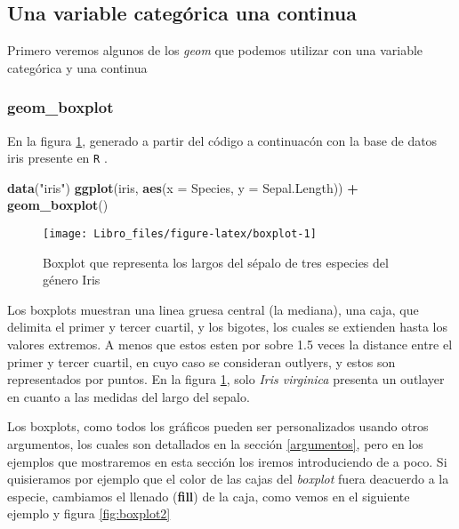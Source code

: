 \documentclass[]{book}
\newenvironment{Shaded}{\begin{snugshade}}{\end{snugshade}}
\newcommand{\DataTypeTok}[1]{\textcolor[rgb]{0.13,0.29,0.53}{#1}}
\newcommand{\KeywordTok}[1]{\textcolor[rgb]{0.13,0.29,0.53}{\textbf{#1}}}
\newcommand{\NormalTok}[1]{#1}
\newcommand{\OperatorTok}[1]{\textcolor[rgb]{0.81,0.36,0.00}{\textbf{#1}}}
\newcommand{\StringTok}[1]{\textcolor[rgb]{0.31,0.60,0.02}{#1}}
\begin{document}
\hypertarget{una-variable-categorica-una-continua}{%
\subsection{Una variable categórica una
continua}\label{una-variable-categorica-una-continua}}

Primero veremos algunos de los \emph{geom} que podemos utilizar con una
variable categórica y una continua

\hypertarget{geom_boxplot}{%
\subsubsection{geom\_boxplot}\label{geom_boxplot}}

En la figura \ref{fig:boxplot}, generado a partir del código a
continuacón con la base de datos iris presente en \texttt{R}
\citep{anderson1935irises}.

\begin{Shaded}
\begin{Highlighting}[]
\KeywordTok{data}\NormalTok{(}\StringTok{"iris"}\NormalTok{)}
\KeywordTok{ggplot}\NormalTok{(iris, }\KeywordTok{aes}\NormalTok{(}\DataTypeTok{x =}\NormalTok{ Species, }\DataTypeTok{y =}\NormalTok{ Sepal.Length)) }\OperatorTok{+}\StringTok{ }\KeywordTok{geom_boxplot}\NormalTok{()}
\end{Highlighting}
\end{Shaded}

\begin{figure}

{\centering \texttt{[image: Libro\_files/figure-latex/boxplot-1]} 

}

\caption{Boxplot que representa los largos del sépalo de tres especies del género Iris}\label{fig:boxplot}
\end{figure}

Los boxplots muestran una linea gruesa central (la mediana), una caja,
que delimita el primer y tercer cuartil, y los bigotes, los cuales se
extienden hasta los valores extremos. A menos que estos esten por sobre
1.5 veces la distance entre el primer y tercer cuartil, en cuyo caso se
consideran outlyers, y estos son representados por puntos. En la figura
\ref{fig:boxplot}, solo \emph{Iris virginica} presenta un outlayer en
cuanto a las medidas del largo del sepalo.

Los boxplots, como todos los gráficos pueden ser personalizados usando
otros argumentos, los cuales son detallados en la sección
\ref{argumentos}, pero en los ejemplos que mostraremos en esta sección
los iremos introduciendo de a poco. Si quisieramos por ejemplo que el
color de las cajas del \emph{boxplot} fuera deacuerdo a la especie,
cambiamos el llenado (\textbf{fill}) de la caja, como vemos en el
siguiente ejemplo y figura \ref{fig:boxplot2}
\end{document}

